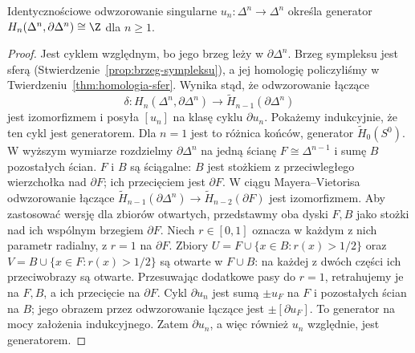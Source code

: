 \begin{lemat}
\label{lem:orientacja-simpleksu}
Identycznościowe odwzorowanie singularne
$u_n:\Delta^n\to\Delta^n$ określa
generator
$H_n(\Delta^n,\partial\Delta^n)\cong\Z$
dla $n\geq1$.
\end{lemat}
\begin{proof}
Jest cyklem względnym, bo jego
brzeg leży w $\partial\Delta^n$.
Brzeg sympleksu jest sferą
(Stwierdzenie~\ref{prop:brzeg-sympleksu}),
a jej homologię policzyliśmy
w Twierdzeniu~\ref{thm:homologia-sfer}.
Wynika stąd, że odwzorowanie łączące
\[
 \delta:H_n(\Delta^n,\partial\Delta^n)
 \longrightarrow
 \widetilde H_{n-1}(\partial\Delta^n)
 \]
jest izomorfizmem i posyła
$[u_n]$ na klasę cyklu
$\partial u_n$.
Pokażemy indukcyjnie, że ten
cykl jest generatorem.
Dla $n=1$ jest to różnica
końców, generator
$\widetilde H_0(S^0)$.
W wyższym wymiarze rozdzielmy
$\partial\Delta^n$ na jedną
ścianę $F\cong\Delta^{n-1}$
i sumę $B$ pozostałych ścian.
$F$ i $B$ są ściągalne:
$B$ jest stożkiem z przeciwległego
wierzchołka nad $\partial F$;
ich przecięciem jest $\partial F$.
W ciągu Mayera--Vietorisa
odwzorowanie łączące
$\widetilde H_{n-1}(\partial\Delta^n)
\to\widetilde H_{n-2}(\partial F)$
jest izomorfizmem. Aby zastosować wersję dla zbiorów otwartych, przedstawmy
oba dyski $F,B$ jako stożki nad ich wspólnym brzegiem $\partial F$.
Niech $r\in[0,1]$ oznacza w każdym z nich parametr radialny,
z $r=1$ na $\partial F$. Zbiory
$U=F\cup\{x\in B:r(x)>1/2\}$ oraz
$V=B\cup\{x\in F:r(x)>1/2\}$ są otwarte w $F\cup B$:
na każdej z dwóch części ich przeciwobrazy są otwarte.
Przesuwając dodatkowe pasy do $r=1$, retrahujemy je na $F,B$,
a ich przecięcie na $\partial F$.
Cykl $\partial u_n$ jest sumą
$\pm u_F$ na $F$ i pozostałych
ścian na $B$; jego obrazem przez
odwzorowanie łączące jest
$\pm[\partial u_F]$.
To generator na mocy
założenia indukcyjnego.
Zatem $\partial u_n$, a więc
również $u_n$ względnie,
jest generatorem.
\end{proof}

